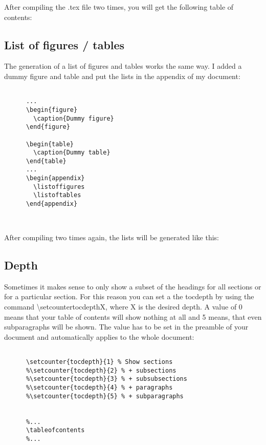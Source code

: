     After compiling the .tex file two times, you will get the following table of contents:
  
  \subsection{List of figures / tables}
    The generation of a list of figures and tables works the same way. I added a dummy figure and table and put the lists in the appendix of my document:
    
    \begin{lstlisting}[language={[LaTeX]TeX}, breaklines=true,frame=single]
      
      ...
      \begin{figure}
        \caption{Dummy figure}
      \end{figure}
      
      \begin{table}
        \caption{Dummy table}
      \end{table}
      ...
      \begin{appendix}
        \listoffigures
        \listoftables
      \end{appendix}
      
      
    \end{lstlisting}

      After compiling two times again, the lists will be generated like this:

    \subsection{Depth}
      Sometimes it makes sense to only show a subset of the headings 
      for all sections or for a particular section. For this reason 
      you can set a the tocdepth by using the command \textbackslash setcounter{tocdepth}{X}, where X is the desired depth. A value of 0 means that your table of contents will show nothing at all and 5 means, that even subparagraphs will be shown. The value has to be set in the preamble of your document and automatically applies to the whole document:
    \begin{lstlisting}[language={[LaTeX]TeX}, breaklines=true,frame=single]
      % ...

      \setcounter{tocdepth}{1} % Show sections
      %\setcounter{tocdepth}{2} % + subsections
      %\setcounter{tocdepth}{3} % + subsubsections
      %\setcounter{tocdepth}{4} % + paragraphs
      %\setcounter{tocdepth}{5} % + subparagraphs
      
      
      %...
      \tableofcontents
      %...
      
    \end{lstlisting}


